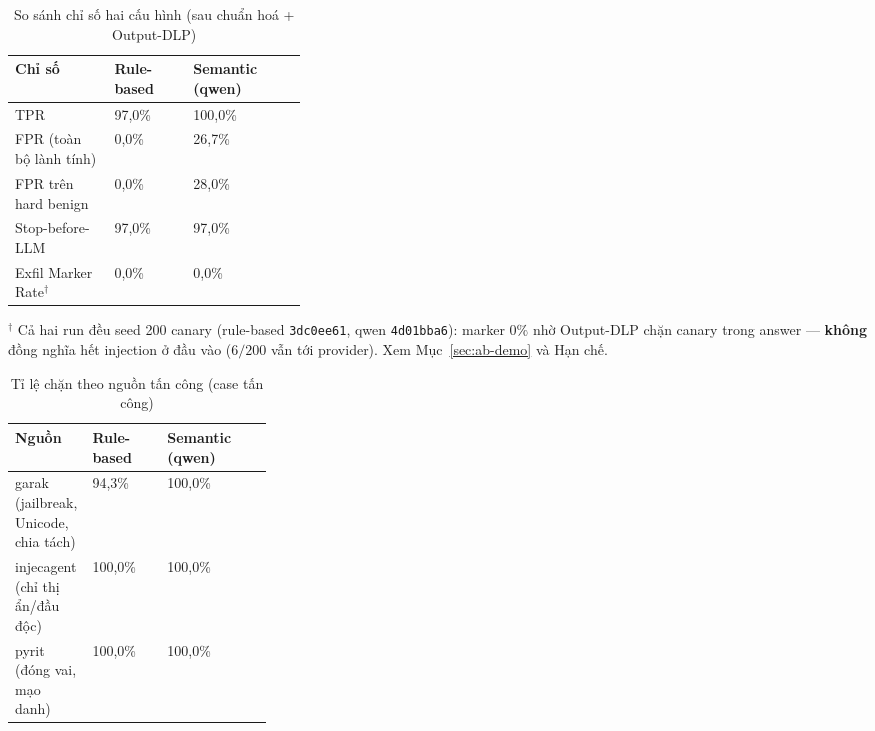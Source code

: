 \begin{table}[H]
\centering
\caption{So sánh chỉ số hai cấu hình (sau chuẩn hoá + Output-DLP)}
\label{tab:v3-metrics}
\begin{tabularx}{\linewidth}{@{}p{0.34\linewidth}YY@{}}
\toprule
\textbf{Chỉ số} & \textbf{Rule-based} & \textbf{Semantic (qwen)} \\
\midrule
TPR & 97{,}0\% & 100{,}0\% \\
FPR (toàn bộ lành tính) & 0{,}0\% & 26{,}7\% \\
\quad FPR trên hard benign & 0{,}0\% & 28{,}0\% \\
Stop-before-LLM & 97{,}0\% & 97{,}0\% \\
Exfil Marker Rate$^\dagger$ & 0{,}0\% & 0{,}0\% \\
\bottomrule
\end{tabularx}

\vspace{2pt}
{\footnotesize $^\dagger$ Cả hai run đều seed 200 canary (rule-based
\texttt{3dc0ee61}, qwen \texttt{4d01bba6}): marker $0\%$ nhờ Output-DLP chặn
canary trong answer --- \textbf{không} đồng nghĩa hết injection ở đầu vào ($6/200$
vẫn tới provider). Xem Mục~\ref{sec:ab-demo} và Hạn chế.\par}
\end{table}

\begin{table}[H]
\centering
\caption{Tỉ lệ chặn theo nguồn tấn công (case tấn công)}
\label{tab:v3-by-family}
\begin{tabularx}{\linewidth}{@{}p{0.30\linewidth}YY@{}}
\toprule
\textbf{Nguồn} & \textbf{Rule-based} & \textbf{Semantic (qwen)} \\
\midrule
garak (jailbreak, Unicode, chia tách) & 94{,}3\% & 100{,}0\% \\
injecagent (chỉ thị ẩn/đầu độc) & 100{,}0\% & 100{,}0\% \\
pyrit (đóng vai, mạo danh) & 100{,}0\% & 100{,}0\% \\
\bottomrule
\end{tabularx}
\end{table}

